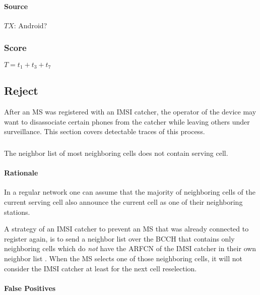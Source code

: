 \documentclass[a4paper,11pt,notitlepage,bigheadings,oneside]{scrartcl}
\begin{document}
\paragraph{Source}

$TX$: Android?


\subsubsection{Score}

$T = t_1 + t_3 + t_7$

\subsection{Reject}

After an MS was registered with an IMSI catcher, the operator of the device may
want to disassociate certain phones from the catcher while leaving others under
surveillance. This section covers detectable traces of this process.

\subsubsection{}

The neighbor list of most neighboring cells does not contain serving cell.

\paragraph{Rationale}

In a regular network one can assume that the majority of neighboring cells of
the current serving cell also announce the current cell as one of their
neighboring stations. 

A strategy of an IMSI catcher to prevent an MS that was already connected to
register again, is to send a neighbor list over the BCCH that contains only
neighboring cells which do \emph{not} have the ARFCN of the IMSI catcher in
their own neighbor list \cite[0027]{bott2000verfahren}. When the MS selects one of
those neighboring cells, it will not consider the IMSI catcher at least for the
next cell reselection.

\paragraph{False Positives}
\end{document}
